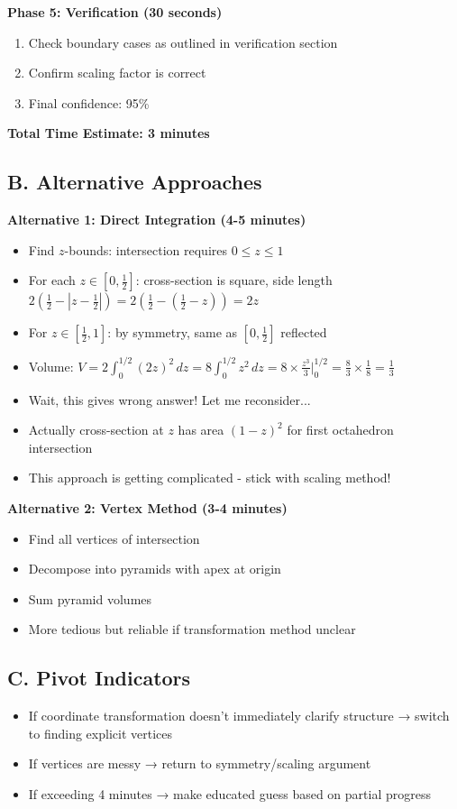 \documentclass[11pt]{article}
\begin{document}
\begin{roadmapbox}
\textbf{Phase 5: Verification (30 seconds)}
\begin{enumerate}[leftmargin=*]
    \item Check boundary cases as outlined in verification section
    \item Confirm scaling factor is correct
    \item Final confidence: 95\%
\end{enumerate}

\textbf{Total Time Estimate: 3 minutes}

\subsection*{B. Alternative Approaches}

\textbf{Alternative 1: Direct Integration (4-5 minutes)}
\begin{itemize}[leftmargin=*]
    \item Find $z$-bounds: intersection requires $0 \le z \le 1$
    \item For each $z \in [0, \frac{1}{2}]$: cross-section is square, side length $2(\frac{1}{2}-|z-\frac{1}{2}|) = 2(\frac{1}{2} - (\frac{1}{2}-z)) = 2z$
    \item For $z \in [\frac{1}{2}, 1]$: by symmetry, same as $[0, \frac{1}{2}]$ reflected
    \item Volume: $V = 2\int_0^{1/2} (2z)^2 \, dz = 8\int_0^{1/2} z^2 \, dz = 8 \times \frac{z^3}{3}\big|_0^{1/2} = \frac{8}{3} \times \frac{1}{8} = \frac{1}{3}$
    \item Wait, this gives wrong answer! Let me reconsider...
    \item Actually cross-section at $z$ has area $(1-z)^2$ for first octahedron intersection
    \item This approach is getting complicated - stick with scaling method!
\end{itemize}

\textbf{Alternative 2: Vertex Method (3-4 minutes)}
\begin{itemize}[leftmargin=*]
    \item Find all vertices of intersection
    \item Decompose into pyramids with apex at origin
    \item Sum pyramid volumes
    \item More tedious but reliable if transformation method unclear
\end{itemize}

\subsection*{C. Pivot Indicators}
\begin{itemize}[leftmargin=*]
    \item If coordinate transformation doesn't immediately clarify structure → switch to finding explicit vertices
    \item If vertices are messy → return to symmetry/scaling argument
    \item If exceeding 4 minutes → make educated guess based on partial progress
\end{itemize}


\end{roadmapbox}
\end{document}
